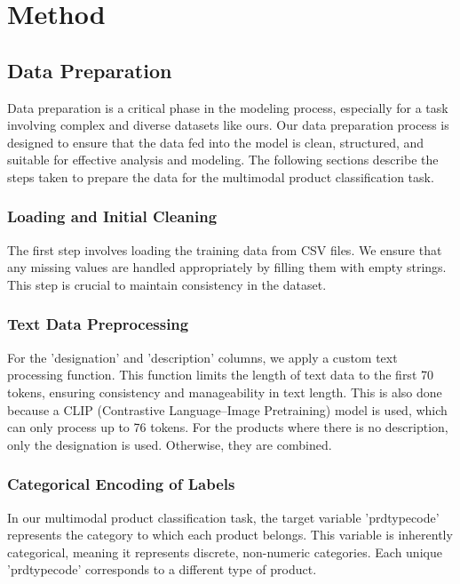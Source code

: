 \chapter{Method}
\label{sec:method}

\section{Data Preparation}
Data preparation is a critical phase in the modeling process, especially for a task involving complex and diverse datasets like ours. Our data preparation process is designed to ensure that the data fed into the model is clean, structured, and suitable for effective analysis and modeling. The following sections describe the steps taken to prepare the data for the multimodal product classification task.

\subsection{Loading and Initial Cleaning}

The first step involves loading the training data from CSV files. We ensure that any missing values are handled appropriately by filling them with empty strings. This step is crucial to maintain consistency in the dataset.

\subsection{Text Data Preprocessing}

For the 'designation' and 'description' columns, we apply a custom text processing function. This function limits the length of text data to the first 70 tokens, ensuring consistency and manageability in text length. This is also done because a CLIP (Contrastive Language–Image Pretraining) model is used, which can only process up to 76 tokens. For the products where there is no description, only the designation is used. Otherwise, they are combined.

\subsection{Categorical Encoding of Labels}

In our multimodal product classification task, the target variable 'prdtypecode' represents the category to which each product belongs. This variable is inherently categorical, meaning it represents discrete, non-numeric categories. Each unique 'prdtypecode' corresponds to a different type of product.

